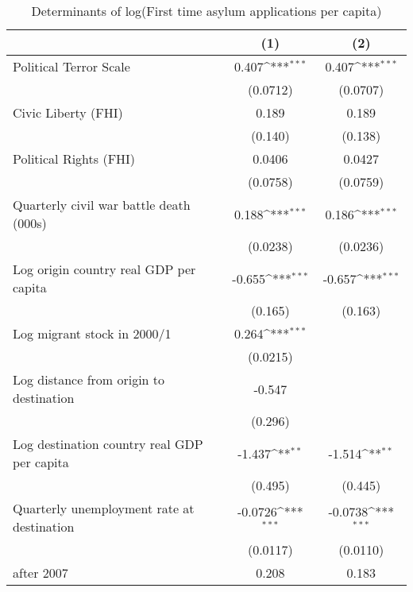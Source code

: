 \begin{table}[htbp]\centering
\def\sym#1{\ifmmode^{#1}\else\(^{#1}\)\fi}
\caption{Determinants of log(First time asylum applications per capita)}
\begin{tabular}{l*{2}{c}}
\hline\hline
                    &\multicolumn{1}{c}{(1)}         &\multicolumn{1}{c}{(2)}         \\
\hline
Political Terror Scale&       0.407\sym{***}&       0.407\sym{***}\\
                    &    (0.0712)         &    (0.0707)         \\
[1em]
Civic Liberty (FHI) &       0.189         &       0.189         \\
                    &     (0.140)         &     (0.138)         \\
[1em]
Political Rights (FHI)&      0.0406         &      0.0427         \\
                    &    (0.0758)         &    (0.0759)         \\
[1em]
Quarterly civil war battle death (000s)&       0.188\sym{***}&       0.186\sym{***}\\
                    &    (0.0238)         &    (0.0236)         \\
[1em]
Log origin country real GDP per capita&      -0.655\sym{***}&      -0.657\sym{***}\\
                    &     (0.165)         &     (0.163)         \\
[1em]
Log migrant stock in 2000/1&       0.264\sym{***}&                     \\
                    &    (0.0215)         &                     \\
[1em]
Log distance from origin to destination&      -0.547         &                     \\
                    &     (0.296)         &                     \\
[1em]
Log destination country real GDP per capita&      -1.437\sym{**} &      -1.514\sym{**} \\
                    &     (0.495)         &     (0.445)         \\
[1em]
Quarterly unemployment rate at destination&     -0.0726\sym{***}&     -0.0738\sym{***}\\
                    &    (0.0117)         &    (0.0110)         \\
[1em]
after 2007          &       0.208         &       0.183         \\

\end{tabular}
\end{table}
